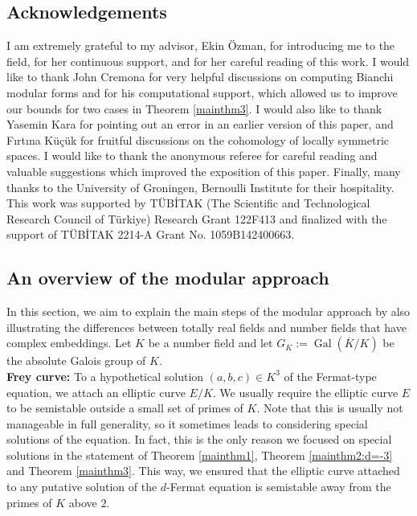 \documentclass[]{article}
\newcounter{cases}
\begin{document}
\subsection*{Acknowledgements}
I am extremely grateful to my advisor, Ekin \"{O}zman, for introducing me to the field, for her continuous support, and for her careful reading of this work. I would like to thank John Cremona for very helpful discussions on computing Bianchi modular forms and for his computational support, which allowed us to improve our bounds for two cases in Theorem \ref{mainthm3}. I would also like to thank Yasemin Kara for pointing out an error in an earlier version of this paper, and F{\i}rt{\i}na K\"{u}\c{c}\"{u}k for fruitful discussions on the cohomology of locally symmetric spaces. I would like to thank the anonymous referee for careful reading and valuable suggestions which improved the exposition of this paper. Finally, many thanks to the University of Groningen, Bernoulli Institute for their hospitality. This work was supported by T\"{U}B\.ITAK (The Scientific and Technological Research Council of T\"{u}rkiye) Research Grant 122F413 and finalized with the support of T\"{U}B\.ITAK 2214-A Grant No. 1059B142400663.

\subsection{An overview of the modular approach}

In this section, we aim to explain the main steps of the modular approach by also illustrating the differences between totally real fields and number fields that have complex embeddings. Let $K$ be a number field and let $G_K:=\operatorname{Gal}(\overline{K}/K)$ be the absolute Galois group of $K$.\\

\noindent\textbf{Frey curve: }To a hypothetical solution $(a,b,c)\in K^3$ of the Fermat-type equation, we attach an elliptic curve $E/K$. We usually require the elliptic curve $E$ to be semistable outside a small set of primes of $K$. Note that this is usually not manageable in full generality, so it sometimes leads to considering special solutions of the equation. In fact, this is the only reason we focused on special solutions in the statement of Theorem \ref{mainthm1}, Theorem \ref{mainthm2:d=-3} and Theorem \ref{mainthm3}. This way, we ensured that the elliptic curve attached to any putative solution of the 
$d$-Fermat equation is semistable away from the primes of $K$ above $2$.
\end{document}

